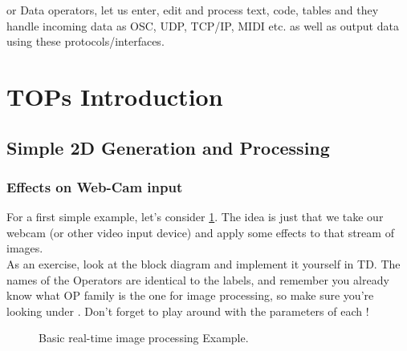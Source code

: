 \DATs or Data operators, let us enter, edit and process text, code, tables and they handle incoming data as OSC, UDP, TCP/IP, MIDI etc. as well as output data using these protocols/interfaces.

\section{TOPs Introduction}

\subsection{Simple 2D Generation and Processing}

\subsubsection{Effects on Web-Cam input}
For a first simple example, let's consider \ref{fig:simple2d}. The idea is just that we take our webcam (or other video input device) and apply some effects to that stream of images.\\
As an exercise, look at the block diagram and implement it yourself in TD. The names of the Operators are identical to the labels, and remember you already know what OP family is the one for image processing, so make sure you're looking under \TOPs. Don't forget to play around with the parameters of each \OP!



  \begin{figure}[htb]
  \centering


  \caption{Basic real-time image processing Example.}
  \label{fig:simple2d}
\end{figure}



